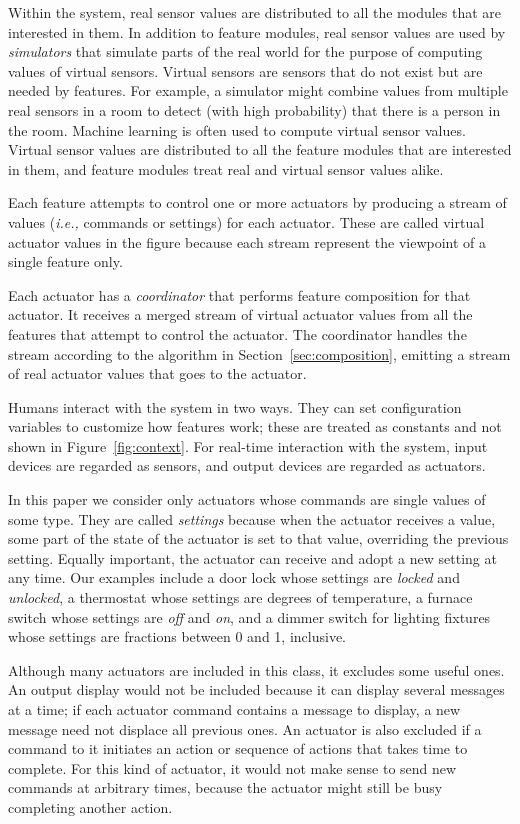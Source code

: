 \documentclass[conference]{IEEEtran}
\begin{document}
Within the system, real sensor values are distributed to all the modules
that are interested in them.
In addition to feature modules, real sensor values are used by
{\it simulators} that 
simulate parts of the real world for the purpose of computing values
of virtual sensors.
Virtual sensors are sensors that do not exist but are needed by features.
For example, a simulator might
combine values from multiple real sensors
in a room to detect (with high probability) that there is a person in
the room.
Machine learning is often used to compute virtual sensor values.
Virtual sensor values are distributed to all the feature modules that are
interested in them, and feature modules
treat real and virtual sensor values alike.

Each feature attempts to control one or more actuators by producing a
stream of values ({\it i.e.,} commands or settings) 
for each actuator.
These are called virtual actuator values in the figure because each stream
represent the viewpoint of a single feature only.

Each actuator has a {\it coordinator} that performs feature composition
for that actuator.
It receives a merged stream of virtual actuator values from all the
features that attempt to control the actuator.
The coordinator handles the stream according to the algorithm in
Section~\ref{sec:composition}, emitting a 
stream of real actuator values that goes to the actuator.

Humans interact with the system in two ways.
They can set configuration variables to customize how features work;
these are treated as constants and not shown in Figure~\ref{fig:context}.
For real-time interaction with the system,
input devices are regarded as sensors, and output devices are
regarded as actuators.

In this paper we consider only actuators whose commands are single
values of some type.
They are called {\it settings} because when the actuator receives a
value, some part of the state of the actuator is set to that value,
overriding the previous setting.
Equally important, the actuator can 
receive and adopt a new setting at any time.
Our examples include a door lock whose settings are {\it locked}
and {\it unlocked}, a thermostat whose settings are degrees of
temperature, a furnace switch
whose settings are {\it off} and {\it on},
and a dimmer switch for lighting fixtures
whose settings are fractions between 0 and 1,
inclusive.

Although many actuators are included in this class, it excludes some
useful ones.
An output display would not be included because it can display several
messages at a time; if each actuator command contains a message to
display, a new message need not displace all previous ones.
An actuator is also excluded if a command to it initiates an action
or sequence of actions that takes time to complete.
For this kind of actuator, it would not make sense to send new commands
at arbitrary times, because the actuator might still be busy completing
another action.
\end{document}

